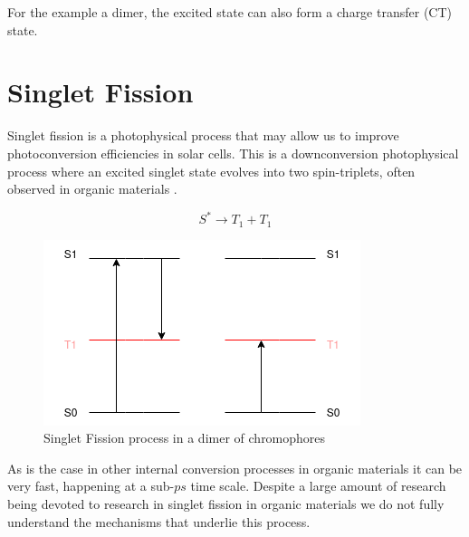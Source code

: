 For the example a dimer, the excited state can also form a charge transfer (CT) state.



\section{Singlet Fission}



Singlet fission is a photophysical process that may allow us to improve photoconversion efficiencies in solar cells. This is a downconversion photophysical process where an excited singlet state evolves into two spin-triplets, often observed in organic materials \cite{casanova2018theoretical} \cite{smith2010singlet}.

\begin{equation}
    S^{*} \to T_1 + T_1
\end{equation}

\begin{figure}
\centering
\includegraphics[scale=0.6]{Figures/SF.png}
\caption{Singlet Fission process in a dimer of chromophores}
\end{figure}

As is the case in other internal conversion processes in organic materials it can be very fast, happening at a sub-$ps$ time scale. Despite a large amount of research being devoted to research in singlet fission in organic materials we do not fully understand the mechanisms that underlie this process. 

